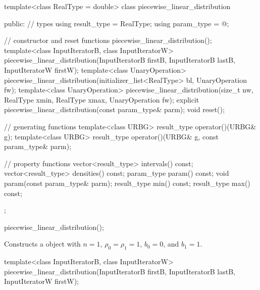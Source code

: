 %
%
\begin{codeblock}
template<class RealType = double>
  class piecewise_linear_distribution {
  public:
    // types
    using result_type = RealType;
    using param_type  = @\unspec@;

    // constructor and reset functions
    piecewise_linear_distribution();
    template<class InputIteratorB, class InputIteratorW>
      piecewise_linear_distribution(InputIteratorB firstB, InputIteratorB lastB,
                                    InputIteratorW firstW);
    template<class UnaryOperation>
      piecewise_linear_distribution(initializer_list<RealType> bl, UnaryOperation fw);
    template<class UnaryOperation>
      piecewise_linear_distribution(size_t nw, RealType xmin, RealType xmax, UnaryOperation fw);
    explicit piecewise_linear_distribution(const param_type& parm);
    void reset();

    // generating functions
    template<class URBG>
      result_type operator()(URBG& g);
    template<class URBG>
      result_type operator()(URBG& g, const param_type& parm);

    // property functions
    vector<result_type> intervals() const;
    vector<result_type> densities() const;
    param_type param() const;
    void param(const param_type& parm);
    result_type min() const;
    result_type max() const;
  };
\end{codeblock}

\begin{itemdecl}
piecewise_linear_distribution();
\end{itemdecl}

\begin{itemdescr}
\pnum
\effects
Constructs a  object
 with $n = 1$,
 $\rho_0 = \rho_1 = 1$,
 $b_0 = 0$,
 and $b_1 = 1$.
\end{itemdescr}

\begin{itemdecl}
template<class InputIteratorB, class InputIteratorW>
 piecewise_linear_distribution(InputIteratorB firstB, InputIteratorB lastB,
                               InputIteratorW firstW);
\end{itemdecl}

